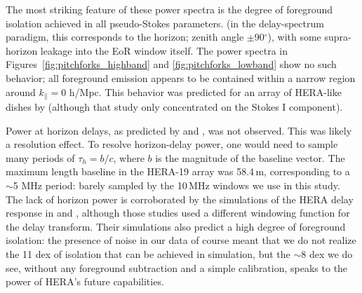 \documentclass[twocolumn, trackchanges]{aastex61}
\begin{document}
The most striking feature of these power spectra is the degree of foreground isolation achieved in all pseudo-Stokes parameters.  (in the delay-spectrum paradigm, this corresponds to the horizon; zenith angle $\pm$90$^{\circ}$), with some supra-horizon leakage \citep{Pober13} into the EoR window itself. The power spectra in Figures~\ref{fig:pitchforks_highband} and \ref{fig:pitchforks_lowband} show no such behavior; all foreground emission appears to be contained within a narrow region around $k_{\parallel}=0$ h/Mpc. This behavior was predicted for an array of HERA-like dishes by \citealt{Nithya.15b} (although that study only concentrated on the Stokes I component). 


Power at horizon delays, as predicted by \cite{Nithya.15b} and \cite{Neben.16}, was not observed. This was likely a resolution effect. To resolve horizon-delay power, one would need to sample many periods of $\tau_h=b/c$, where $b$ is the magnitude of the baseline vector. The maximum length baseline in the HERA-19 array was 58.4\,m, corresponding to a $\sim$5 MHz period: barely sampled by the 10\,MHz windows we use in this study. The lack of horizon power is corroborated by the simulations of the HERA delay response in \cite{Ewall-Wice.16} and \cite{Thyagarajan.16}, although those studies used a different windowing function for the delay transform. Their simulations also predict a high degree of foreground isolation: the presence of noise in our data of course meant that we do not realize the 11 dex of isolation that can be achieved in simulation, but the $\sim$8 dex we do see, without any foreground subtraction and a simple calibration, speaks to the power of HERA's future capabilities.
\end{document}
